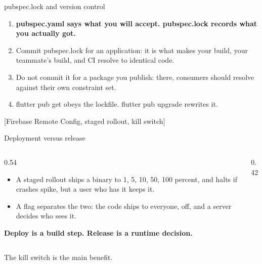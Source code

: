 \documentclass[10pt,aspectratio=169,t]{beamer}
\begin{document}
\begin{frame}[eyebrow=Packages]{pubspec.lock and version control}
  \vskip 2mm
  \begin{enumerate}
    \item \textbf{pubspec.yaml says what you will accept. pubspec.lock records what you actually got.}
    \item Commit pubspec.lock for an application: it is what makes your build, your teammate's build, and CI resolve to identical code.
    \item Do not commit it for a package you publish: there, consumers should resolve against their own constraint set.
    \item flutter pub get obeys the lockfile. flutter pub upgrade rewrites it.
  \end{enumerate}
\end{frame}

[Firebase Remote Config, staged rollout, kill switch]

\begin{frame}[eyebrow=Feature flags]{Deployment versus release}
  \begin{columns}[T]
    \begin{column}{0.54\textwidth}
      \begin{itemize}
        \item A staged rollout ships a binary to 1, 5, 10, 50, 100 percent, and halts if crashes spike, but a user who has it keeps it.
        \item A flag separates the two: the code ships to everyone, off, and a server decides who sees it.
      \end{itemize}
      \textbf{Deploy is a build step. Release is a runtime decision.}
    \end{column}
    \begin{column}{0.42\textwidth}
    \end{column}
  \end{columns}
  \begin{takeaway}{The kill switch is the main benefit.}\end{takeaway}
\end{frame}
\end{document}

